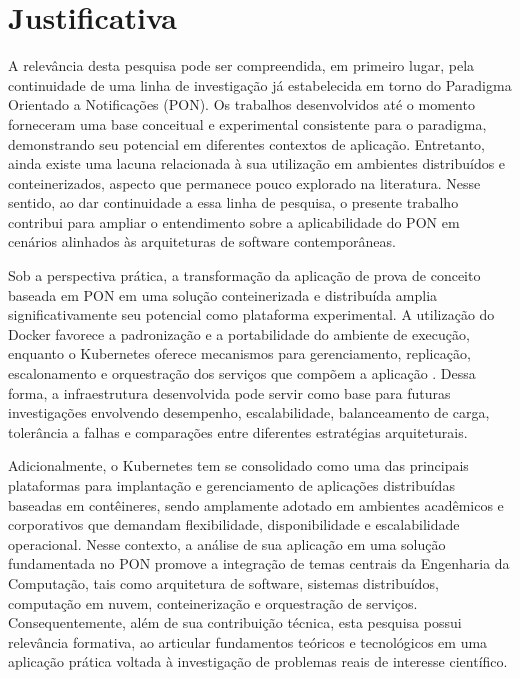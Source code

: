 \section{Justificativa}

A relevância desta pesquisa pode ser compreendida, em primeiro lugar, pela continuidade de uma linha de investigação já estabelecida em torno do Paradigma Orientado a Notificações (PON). Os trabalhos desenvolvidos até o momento forneceram uma base conceitual e experimental consistente para o paradigma, demonstrando seu potencial em diferentes contextos de aplicação. Entretanto, ainda existe uma lacuna relacionada à sua utilização em ambientes distribuídos e conteinerizados, aspecto que permanece pouco explorado na literatura. Nesse sentido, ao dar continuidade a essa linha de pesquisa, o presente trabalho contribui para ampliar o entendimento sobre a aplicabilidade do PON em cenários alinhados às arquiteturas de software contemporâneas.

Sob a perspectiva prática, a transformação da aplicação de prova de conceito baseada em PON em uma solução conteinerizada e distribuída amplia significativamente seu potencial como plataforma experimental. A utilização do Docker favorece a padronização e a portabilidade do ambiente de execução, enquanto o Kubernetes oferece mecanismos para gerenciamento, replicação, escalonamento e orquestração dos serviços que compõem a aplicação \cite{docker2026documentation}\cite{kubernetes2026documentation}. Dessa forma, a infraestrutura desenvolvida pode servir como base para futuras investigações envolvendo desempenho, escalabilidade, balanceamento de carga, tolerância a falhas e comparações entre diferentes estratégias arquiteturais.

Adicionalmente, o Kubernetes tem se consolidado como uma das principais plataformas para implantação e gerenciamento de aplicações distribuídas baseadas em contêineres, sendo amplamente adotado em ambientes acadêmicos e corporativos que demandam flexibilidade, disponibilidade e escalabilidade operacional. Nesse contexto, a análise de sua aplicação em uma solução fundamentada no PON promove a integração de temas centrais da Engenharia da Computação, tais como arquitetura de software, sistemas distribuídos, computação em nuvem, conteinerização e orquestração de serviços. Consequentemente, além de sua contribuição técnica, esta pesquisa possui relevância formativa, ao articular fundamentos teóricos e tecnológicos em uma aplicação prática voltada à investigação de problemas reais de interesse científico.



